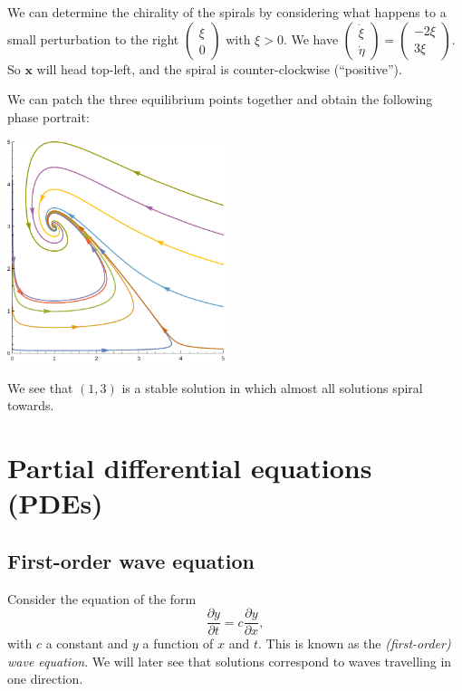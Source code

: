 \documentclass[a4paper]{article}
\begin{document}
\begin{eg}
  We can determine the chirality of the spirals by considering what happens to a small perturbation to the right $
  \begin{pmatrix}
    \xi\\0
  \end{pmatrix}$ with $\xi > 0$. We have $
  \begin{pmatrix}
    \dot\xi\\\dot\eta
  \end{pmatrix} =
  \begin{pmatrix}
    -2\xi\\3\xi
  \end{pmatrix}$. So $\mathbf{x}$ will head top-left, and the spiral is counter-clockwise (``positive'').

  We can patch the three equilibrium points together and obtain the following phase portrait:
  \begin{center}
    \includegraphics[width=180pt]{images/de_population_phase.pdf}
  \end{center}
  We see that $(1, 3)$ is a stable solution in which almost all solutions spiral towards.
\end{eg}

\section{Partial differential equations (PDEs)}
\subsection{First-order wave equation}
Consider the equation of the form
\[
  \frac{\partial y}{\partial t} = c\frac{\partial y}{\partial x},
\]
with $c$ a constant and $y$ a function of $x$ and $t$. This is known as the \emph{(first-order) wave equation}. We will later see that solutions correspond to waves travelling in one direction.
\end{document}
